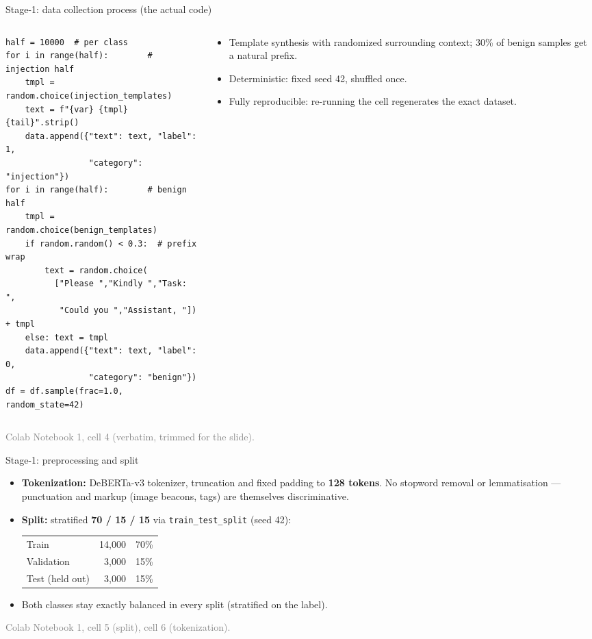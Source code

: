 \documentclass[aspectratio=169]{beamer}
\newcommand{\src}[1]{{\footnotesize\textcolor{gray}{#1}}}
\begin{document}
\begin{frame}[fragile]{Stage-1: data collection process (the actual code)}
\begin{columns}
\begin{column}{0.55\textwidth}
{\scriptsize
\begin{verbatim}
half = 10000  # per class
for i in range(half):        # injection half
    tmpl = random.choice(injection_templates)
    text = f"{var} {tmpl} {tail}".strip()
    data.append({"text": text, "label": 1,
                 "category": "injection"})
for i in range(half):        # benign half
    tmpl = random.choice(benign_templates)
    if random.random() < 0.3:  # prefix wrap
        text = random.choice(
          ["Please ","Kindly ","Task: ",
           "Could you ","Assistant, "]) + tmpl
    else: text = tmpl
    data.append({"text": text, "label": 0,
                 "category": "benign"})
df = df.sample(frac=1.0, random_state=42)
\end{verbatim}
}
\end{column}
\begin{column}{0.45\textwidth}
\begin{itemize}
  \item Template synthesis with randomized surrounding context; 30\% of benign samples get a natural prefix.
  \item Deterministic: fixed seed 42, shuffled once.
  \item Fully reproducible: re-running the cell regenerates the exact dataset.
\end{itemize}
\end{column}
\end{columns}
\src{Colab Notebook 1, cell 4 (verbatim, trimmed for the slide).}
\end{frame}

\begin{frame}{Stage-1: preprocessing and split}
\begin{itemize}
  \item \textbf{Tokenization:} DeBERTa-v3 tokenizer, truncation and fixed padding to \textbf{128 tokens}. No stopword removal or lemmatisation --- punctuation and markup (image beacons, tags) are themselves discriminative.
  \item \textbf{Split:} stratified \textbf{70 / 15 / 15} via \texttt{train\_test\_split} (seed 42):
  \begin{center}
  \begin{tabular}{@{}lrr@{}}
  \toprule
  Train & 14{,}000 & 70\% \\
  Validation & 3{,}000 & 15\% \\
  Test (held out) & 3{,}000 & 15\% \\
  \bottomrule
  \end{tabular}
  \end{center}
  \item Both classes stay exactly balanced in every split (stratified on the label).
\end{itemize}
\src{Colab Notebook 1, cell 5 (split), cell 6 (tokenization).}
\end{frame}
\end{document}
